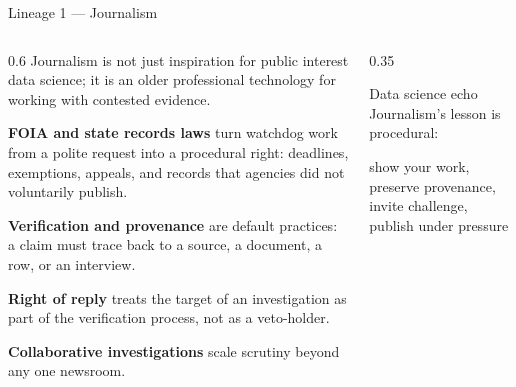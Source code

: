 \documentclass[9pt,aspectratio=169]{beamer}
\begin{document}
\begin{frame}{Lineage 1 --- Journalism}
    \begin{columns}[T]
        \begin{column}{0.6\textwidth}
            Journalism is not just inspiration for public interest data science; it is an older professional technology for working with contested evidence.

            \medskip

            \textbf{FOIA and state records laws} turn watchdog work from a polite request into a procedural right: deadlines, exemptions, appeals, and records that agencies did not voluntarily publish.

            \medskip

            \textbf{Verification and provenance} are default practices: a claim must trace back to a source, a document, a row, or an interview.

            \medskip

            \textbf{Right of reply} treats the target of an investigation as part of the verification process, not as a veto-holder.

            \medskip

            \textbf{Collaborative investigations} scale
            scrutiny beyond any one newsroom.
        \end{column}
        \begin{column}{0.35\textwidth}
            \begin{alertblock}{Data science echo}
                \small
                Journalism's lesson is procedural:

                \medskip

                show your work, preserve provenance, invite challenge, publish under pressure
            \end{alertblock}
        \end{column}
    \end{columns}
\end{frame}
\end{document}
